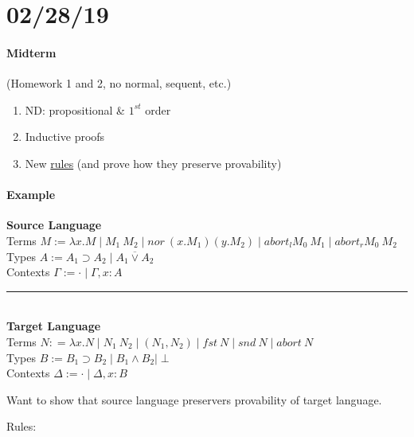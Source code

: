 \documentclass[12 pt]{article}
\begin{document}
\section{02/28/19}
\paragraph{Midterm} (Homework 1 and 2, no normal, sequent, etc.)
\begin{enumerate}
	\item ND: propositional \& $1^{st}$ order
	\item Inductive proofs
	\item New \underline{rules} (and prove how they preserve
	      provability)
\end{enumerate}
\paragraph{Example}
\textbf{Source Language}
\\ Terms $M := \lambda x. M \mid M_1 \ M_2 \mid nor\ (x.M_1)
	(y.M_2) \mid abort_l M_0 \ M_1 \mid abort_r M_0\ M_2$
\\ Types $A := A_1 \supset A_2 \mid A_1 \overline{\lor} A_2$
\\ Contexts $\Gamma := \cdot \mid \Gamma, x :A$
\\ \noindent \rule{\textwidth}{0.5pt}
\\ \textbf{Target Language}
\\ Terms $N : = \lambda x.N \mid N_1\ N_2 \mid (N_1, N_2)
	\mid fst\ N \mid snd\ N \mid abort\ N$
\\ Types $B:= B_1 \supset B_2 \mid B_1 \land B_2 \mid \perp$
\\ Contexts $\Delta := \cdot \mid \Delta, x:B$

Want to show that source language preservers provability of
target language.

Rules:
\end{document}
